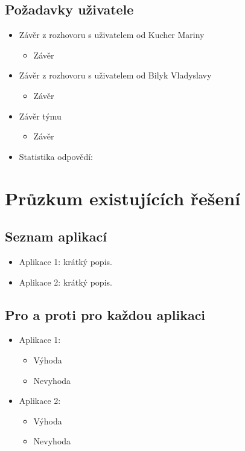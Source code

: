 \documentclass[a4paper,12pt]{article}
\begin{document}
\subsection*{Požadavky uživatele}
\begin{itemize}
    \item Závěr z rozhovoru s uživatelem od Kucher Mariny
    \begin{itemize}
        \item Závěr
    \end{itemize}
    \item Závěr z rozhovoru s uživatelem od Bilyk Vladyslavy
    \begin{itemize}
        \item Závěr
    \end{itemize}
    \item Závěr týmu
    \begin{itemize}
        \item Závěr
    \end{itemize}
    \item Statistika odpovědí:
\end{itemize}

\section*{Průzkum existujících řešení}

\subsection*{Seznam aplikací}
\begin{itemize}
    \item Aplikace 1: krátký popis.
    \item Aplikace 2: krátký popis.
\end{itemize}

\subsection*{Pro a proti pro každou aplikaci}
\begin{itemize}
    \item Aplikace 1:
    \begin{itemize}
        \item Výhoda
        \item Nevyhoda
    \end{itemize}
    \item Aplikace 2:
    \begin{itemize}
        \item Výhoda
        \item Nevyhoda
    \end{itemize}
\end{itemize}
\end{document}
